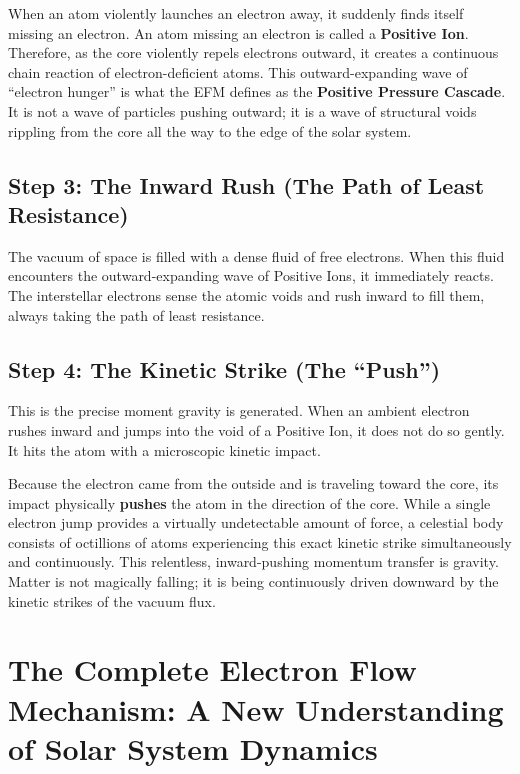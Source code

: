 \documentclass[11pt, a4paper]{article}
\begin{document}
When an atom violently launches an electron away, it suddenly finds itself missing an electron. An atom missing an electron is called a \textbf{Positive Ion}. Therefore, as the core violently repels electrons outward, it creates a continuous chain reaction of electron-deficient atoms. This outward-expanding wave of ``electron hunger'' is what the EFM defines as the \textbf{Positive Pressure Cascade}. It is not a wave of particles pushing outward; it is a wave of structural voids rippling from the core all the way to the edge of the solar system.

\subsection{Step 3: The Inward Rush (The Path of Least Resistance)}
The vacuum of space is filled with a dense fluid of free electrons. When this fluid encounters the outward-expanding wave of Positive Ions, it immediately reacts. The interstellar electrons sense the atomic voids and rush inward to fill them, always taking the path of least resistance. 

\subsection{Step 4: The Kinetic Strike (The ``Push'')}
This is the precise moment gravity is generated. When an ambient electron rushes inward and jumps into the void of a Positive Ion, it does not do so gently. It hits the atom with a microscopic kinetic impact. 

Because the electron came from the outside and is traveling toward the core, its impact physically \textbf{pushes} the atom in the direction of the core. While a single electron jump provides a virtually undetectable amount of force, a celestial body consists of octillions of atoms experiencing this exact kinetic strike simultaneously and continuously. This relentless, inward-pushing momentum transfer is gravity. Matter is not magically falling; it is being continuously driven downward by the kinetic strikes of the vacuum flux.

\section{The Complete Electron Flow Mechanism: A New Understanding of Solar System Dynamics}
\end{document}
